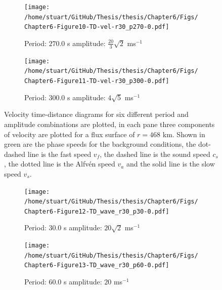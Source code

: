 \documentclass[a4paper,12pt,fourier,authoryear,custommargin]{Classes/PhDThesisPSnPDF}
\begin{document}
\begin{figure}
    \centering
\ContinuedFloat


    \begin{subfigure}[b]{0.79\columnwidth}
        \texttt{[image: /home/stuart/GitHub/Thesis/thesis/Chapter6/Figs/Chapter6-Figure10-TD-vel-r30\_p270-0.pdf]}
        \caption{Period: $270.0$ s amplitude: $\frac{20}{3}\sqrt{2}$ ms$^{{-1}}$}
        \label{fig:TD-vel-r30-p270-0}
    \end{subfigure}

    \begin{subfigure}[b]{0.79\columnwidth}
        \texttt{[image: /home/stuart/GitHub/Thesis/thesis/Chapter6/Figs/Chapter6-Figure11-TD-vel-r30\_p300-0.pdf]}
        \caption{Period: $300.0$ s amplitude: $4\sqrt{5}$ ms$^{{-1}}$}
        \label{fig:TD-vel-r30-p300-0}
    \end{subfigure}
    \caption{Velocity time-distance diagrams for six different period and amplitude combinations are plotted, in each pane three components of velocity are plotted for a flux surface of $r=468$ km. Shown in green are the phase speeds for the background conditions, the dot-dashed line is the fast speed $v_f$, the dashed line is the sound speed $c_s$, the dotted line is the Alfv\'en speed $v_a$ and the solid line is the slow speed $v_s$.}
    \label{fig:TD-vel-r30-c}
\end{figure}





\begin{figure}
    \centering


    \begin{subfigure}[b]{0.79\columnwidth}
        \texttt{[image: /home/stuart/GitHub/Thesis/thesis/Chapter6/Figs/Chapter6-Figure12-TD\_wave\_r30\_p30-0.pdf]}
        \caption{Period: $30.0$ s amplitude: $20\sqrt{2}$ ms$^{{-1}}$}
        \label{fig:TD-wave-r30-p30-0}
    \end{subfigure}

    \begin{subfigure}[b]{0.79\columnwidth}
        \texttt{[image: /home/stuart/GitHub/Thesis/thesis/Chapter6/Figs/Chapter6-Figure13-TD\_wave\_r30\_p60-0.pdf]}
        \caption{Period: $60.0$ s amplitude: $20$ ms$^{{-1}}$}
        \label{fig:TD-wave-r30-p60-0}
    \end{subfigure}
    \caption{}
    \label{fig:TD-fwave-r30}
\end{figure}
\end{document}
